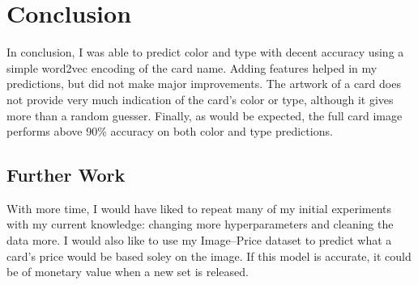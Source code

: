 \section{Conclusion}
\label{conclusion}

In conclusion, I was able to predict color and type with 
decent accuracy using a simple word2vec encoding of the 
card name. Adding features helped in my predictions, but 
did not make major improvements. The artwork of a card 
does not provide very much indication of the card's color 
or type, although it gives more than a random guesser. 
Finally, as would be expected, the full card image performs
above 90\% accuracy on both color and type predictions. 

\subsection{Further Work}
With more time, I would have liked to repeat many of my
initial experiments with my current knowledge: changing more
hyperparameters and cleaning the data more. I would also 
like to use my Image--Price dataset to predict what a card's 
price would be based soley on the image. If this model is 
accurate, it could be of monetary value when a new set is 
released.